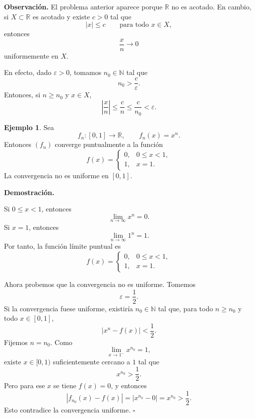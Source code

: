 \documentclass[11pt,a4paper,openany]{book}
\theoremstyle{definition}
\newtheorem{ejemplo}{Ejemplo}[chapter]
\theoremstyle{plain}
\theoremstyle{remark}
\renewenvironment{proof}[1][\textbf{Demostración.}]{%
  \par\noindent #1\ \normalfont
}{\hfill$\square$\par\medskip}
\newenvironment{observacion}
{\par\medskip\noindent\textbf{Observación. }\normalfont}
{\par\medskip}
\newcommand{\R}{\mathbb{R}}
\newcommand{\N}{\mathbb{N}}
\begin{document}
\begin{observacion}
El problema anterior aparece porque $\R$ no es acotado. En cambio, si
$X\subset\R$ es acotado y existe $c>0$ tal que
\[
    |x|\leq c
    \qquad \text{para todo }x\in X,
\]
entonces
\[
    \frac{x}{n}\to 0
\]
uniformemente en $X$.

En efecto, dado $\varepsilon>0$, tomamos $n_0\in\N$ tal que
\[
    n_0>\frac{c}{\varepsilon}.
\]
Entonces, si $n\geq n_0$ y $x\in X$,
\[
    \left|\frac{x}{n}\right|
    \leq \frac{c}{n}
    \leq \frac{c}{n_0}
    <\varepsilon.
\]
\end{observacion}

\begin{ejemplo}
Sea
\[
    f_n:[0,1]\to\R,\qquad f_n(x)=x^n.
\]
Entonces $(f_n)$ converge puntualmente a la función
\[
    f(x)=
    \begin{cases}
        0, & 0\leq x<1,\\
        1, & x=1.
    \end{cases}
\]
La convergencia no es uniforme en $[0,1]$.

\begin{proof}
Si $0\leq x<1$, entonces
\[
    \lim_{n\to\infty}x^n=0.
\]
Si $x=1$, entonces
\[
    \lim_{n\to\infty}1^n=1.
\]
Por tanto, la función límite puntual es
\[
    f(x)=
    \begin{cases}
        0, & 0\leq x<1,\\
        1, & x=1.
    \end{cases}
\]

Ahora probemos que la convergencia no es uniforme. Tomemos
\[
    \varepsilon=\frac12.
\]
Si la convergencia fuese uniforme, existiría $n_0\in\N$ tal que, para todo
$n\geq n_0$ y todo $x\in[0,1]$,
\[
    |x^n-f(x)|<\frac12.
\]
Fijemos $n=n_0$. Como
\[
    \lim_{x\to 1^-}x^{n_0}=1,
\]
existe $x\in[0,1)$ suficientemente cercano a $1$ tal que
\[
    x^{n_0}>\frac12.
\]
Pero para ese $x$ se tiene $f(x)=0$, y entonces
\[
    |f_{n_0}(x)-f(x)|
    =
    |x^{n_0}-0|
    =
    x^{n_0}
    >
    \frac12.
\]
Esto contradice la convergencia uniforme.
\end{proof}
\end{ejemplo}

\begin{center}
\end{center}
\end{document}
